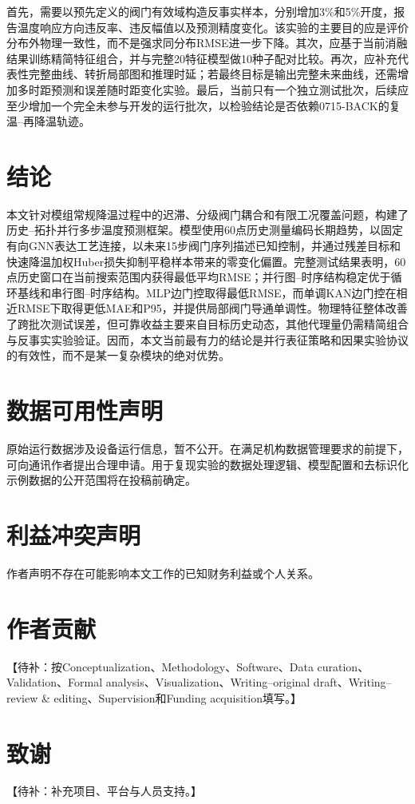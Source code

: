 \documentclass[a4paper,fleqn]{cas-dc}
\newcommand{\todo}[1]{\textcolor{red!70!black}{【待补：#1】}}
\begin{document}
首先，需要以预先定义的阀门有效域构造反事实样本，分别增加3\%和5\%开度，报告温度响应方向违反率、违反幅值以及预测精度变化。该实验的主要目的应是评价分布外物理一致性，而不是强求同分布RMSE进一步下降。其次，应基于当前消融结果训练精简特征组合，并与完整20特征模型做10种子配对比较。再次，应补充代表性完整曲线、转折局部图和推理时延；若最终目标是输出完整未来曲线，还需增加多时距预测和误差随时距变化实验。最后，当前只有一个独立测试批次，后续应至少增加一个完全未参与开发的运行批次，以检验结论是否依赖0715-BACK的复温--再降温轨迹。

\section{结论}\label{sec:conclusion}

本文针对模组常规降温过程中的迟滞、分级阀门耦合和有限工况覆盖问题，构建了历史--拓扑并行多步温度预测框架。模型使用60点历史测量编码长期趋势，以固定有向GNN表达工艺连接，以未来15步阀门序列描述已知控制，并通过残差目标和快速降温加权Huber损失抑制平稳样本带来的零变化偏置。完整测试结果表明，60点历史窗口在当前搜索范围内获得最低平均RMSE；并行图--时序结构稳定优于循环基线和串行图--时序结构。MLP边门控取得最低RMSE，而单调KAN边门控在相近RMSE下取得更低MAE和P95，并提供局部阀门导通单调性。物理特征整体改善了跨批次测试误差，但可靠收益主要来自目标历史动态，其他代理量仍需精简组合与反事实实验验证。因而，本文当前最有力的结论是并行表征策略和因果实验协议的有效性，而不是某一复杂模块的绝对优势。

\section*{数据可用性声明}
原始运行数据涉及设备运行信息，暂不公开。在满足机构数据管理要求的前提下，可向通讯作者提出合理申请。用于复现实验的数据处理逻辑、模型配置和去标识化示例数据的公开范围将在投稿前确定。

\section*{利益冲突声明}
作者声明不存在可能影响本文工作的已知财务利益或个人关系。

\section*{作者贡献}
\todo{按Conceptualization、Methodology、Software、Data curation、Validation、Formal analysis、Visualization、Writing--original draft、Writing--review \& editing、Supervision和Funding acquisition填写。}

\section*{致谢}
\todo{补充项目、平台与人员支持。}



\end{document}
